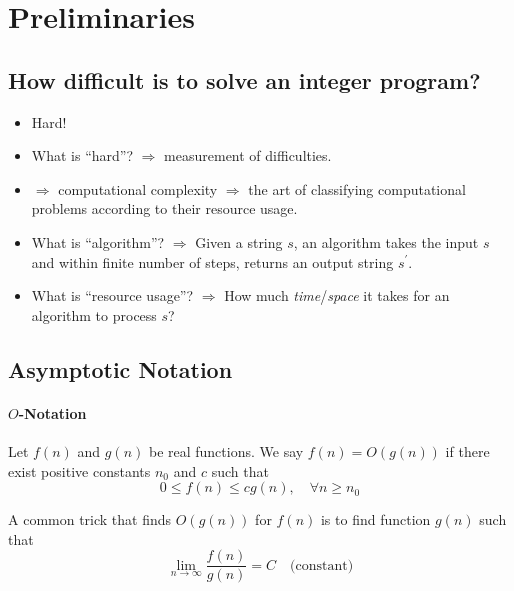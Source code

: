         \section{Preliminaries}
            \subsection{How difficult is to solve an integer program?}
                \begin{itemize}
                    \item Hard!
                    \item What is ``hard''? $\Rightarrow$ measurement of difficulties.
                    \item $\Rightarrow$ computational complexity $\Rightarrow$ the art of classifying computational problems according to their resource usage.
                    \item What is ``algorithm''? $\Rightarrow$ Given a string $s$, an algorithm takes the input $s$ and within finite number of steps, returns an output string $s^\prime$.
                    \item What is ``resource usage''? $\Rightarrow$ How much \textit{time}/\textit{space} it takes for an algorithm to process $s$?
                \end{itemize}

            \subsection{Asymptotic Notation}
                \paragraph{$O$-Notation}
                    Let $f(n)$ and $g(n)$ be real functions. We say $f(n) = O(g(n))$ if there exist positive constants $n_0$ and $c$ such that
                    \begin{equation*}
                        0 \le f(n) \le cg(n), \quad \forall n \ge n_0
                    \end{equation*}

                    A common trick that finds $O(g(n))$ for $f(n)$ is to find function $g(n)$ such that 
                    \begin{equation*}
                        \lim_{n \rightarrow \infty} \frac{f(n)}{g(n)} = C \quad \text{(constant)}
                    \end{equation*}

